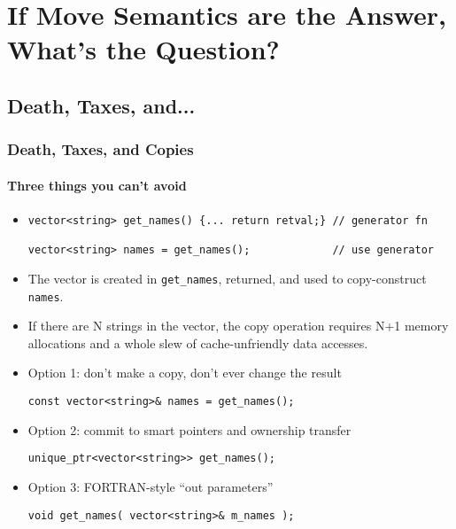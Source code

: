 \lyxframeend{}\section[The Problem]{If Move Semantics are the
Answer, What's the Question?}

\subsection[Problem == Copies]{Death, Taxes, and...}\lyxframeend{}


\begin{frame}[fragile,t]
\frametitle{Death, Taxes, and Copies}
\framesubtitle{Three things you can't avoid}

\begin{itemize}[<+->]

\item{\scriptsize
\begin{verbatim}
vector<string> get_names() {... return retval;} // generator fn

vector<string> names = get_names();             // use generator
\end{verbatim}
}

\item The vector is created in \texttt{get\_names}, returned, and used
to copy-construct \texttt{names}.

\item If there are N strings in the vector, the copy operation requires N+1 memory allocations and a whole slew of cache-unfriendly data accesses.


\vskip 12pt
\item Option 1: don't make a copy, don't ever change the result
{\scriptsize
\begin{verbatim}
const vector<string>& names = get_names();
\end{verbatim}
}

\vskip 12pt

\item Option 2: commit to smart pointers and ownership transfer
{\scriptsize
\begin{verbatim}
unique_ptr<vector<string>> get_names();
\end{verbatim}
}
\vskip 12pt

\item Option 3: FORTRAN-style ``out parameters''
{\scriptsize
\begin{verbatim}
void get_names( vector<string>& m_names );
\end{verbatim}
}


\end{itemize}

\end{frame}

